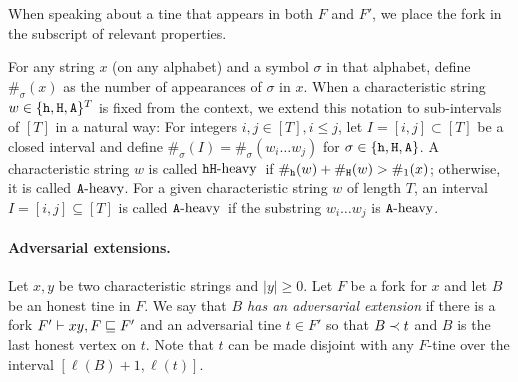   \noindent
  When speaking about a tine that appears in both $F$ and $F'$, 
  we place the fork in the subscript of relevant properties.


    For any string $x$ (on any alphabet) and a symbol $\sigma$ in that alphabet, 
    define $\#_\sigma(x)$ 
    as the number of appearances of $\sigma$ in $x$. 
    When a characteristic string $w \in \{\mathtt{h}, \mathtt{H}, \mathtt{A}\}^T$ is fixed from the context, 
    we extend this notation to sub-intervals of $[T]$ in a natural way: 
    For integers $i, j \in [T], i \leq j$, 
    let $I = [i, j] \subset [T]$ be a closed interval 
    and define $\#_\sigma(I) = \#_\sigma(w_i \ldots w_j)$ for $\sigma \in \{\mathtt{h}, \mathtt{H}, \mathtt{A}\}$. 
    A characteristic string $w$ is called $\mathtt{h}\mathtt{H}\text{-heavy}$\ if $\#_{\mathtt{h}}(w) + \#_{\mathtt{H}}(w) > \#_1(x)$; 
    otherwise, it is called $\mathtt{A}\text{-heavy}$. 
    For a given characteristic string $w$ of length $T$, 
    an interval $I = [i,j] \subseteq [T]$ is called $\mathtt{A}\text{-heavy}$\ 
    if the substring $w_i \ldots w_j$ is $\mathtt{A}\text{-heavy}$.


    \paragraph{Adversarial extensions.} 
    Let $x,y$ be two characteristic strings and $|y| \geq 0$.
    Let $F$ be a fork for $x$ and let $B$ be an honest tine in $F$. 
    We say that \emph{$B$ has an adversarial extension} 
    if there is a fork $F' \vdash xy, F \sqsubseteq F'$ and 
    an adversarial tine $t \in F'$ 
    so that $B \prec t$ and  
    $B$ is the last honest vertex on $t$. 
    Note that $t$ can be made disjoint with any $F$-tine 
    over the interval $[\ell(B) + 1, \ell(t)]$. 
    






